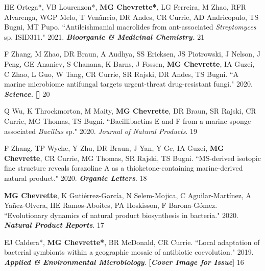 \begin{cvpubs}
\cvpub
{HE Ortega*, VB Lourenzon*, \textbf{MG Chevrette*}, LG Ferreira, M Zhao, RFR Alvarenga, WGP Melo, T Venâncio, DR Andes, CR Currie, AD Andricopulo, TS Bugni, MT Pupo. ``Antileishmanial macrolides from ant-associated \textit{Streptomyces} sp. ISID311." 2021. \textit{\textbf{Bioorganic \& Medicinal Chemistry.}} \textbf{\textit{}}}
{21}

\cvpub
{F Zhang, M Zhao, DR Braun, A Audhya, SS Ericksen, JS Piotrowski, J Nelson, J Peng, GE Ananiev, S Chanana, K Barns, J Fossen, \textbf{MG Chevrette}, IA Guzei, C Zhao, L Guo, W Tang, CR Currie, SR Rajski, DR Andes, TS Bugni. ``A marine microbiome antifungal targets urgent-threat drug-resistant fungi." 2020. \textit{\textbf{Science.}} \textbf{\textit{}} \linebreak
\textbf{[\textit{}]}}
{20}

\cvpub
{Q Wu, K Throckmorton, M Maity, \textbf{MG Chevrette}, DR Braun, SR Rajski, CR Currie, MG Thomas, TS Bugni. ``Bacillibactins E and F from a marine sponge-associated \textit{Bacillus} sp." 2020. \textit{Journal of Natural Products}. \textbf{\textit{}}}
{19}

\cvpub
{F Zhang, TP Wyche, Y Zhu, DR Braun, J Yan, Y Ge, IA Guzei, \textbf{MG Chevrette}, CR Currie, MG Thomas, SR Rajski, TS Bugni. ``MS-derived isotopic fine structure reveals forazoline A as a thioketone-containing marine-derived natural product." 2020. \textit{\textbf{Organic Letters}}. \textbf{\textit{}}}
{18}

\cvpub
{\textbf{MG Chevrette}, K Guti\'{e}rrez-Garc\'{i}a, N Selem-Mojica, C Aguilar-Mart\'{i}nez, A Ya\~{n}ez-Olvera, HE Ramos-Aboites, PA Hoskisson, F Barona-G\'{o}mez. ``Evolutionary dynamics of natural product biosynthesis in bacteria." 2020. \textit{\textbf{Natural Product Reports}}. \textbf{\textit{}}}
{17}

\cvpub
{EJ Caldera*, \textbf{MG Chevrette*}, BR McDonald, CR Currie. ``Local adaptation of bacterial symbionts within a geographic mosaic of antibiotic coevolution." 2019. \textit{\textbf{Applied \& Environmental Microbiology}}. \textbf{\textit{}} \linebreak \textbf{[\textit{Cover Image for Issue}}]}
{16}


\end{cvpubs}
